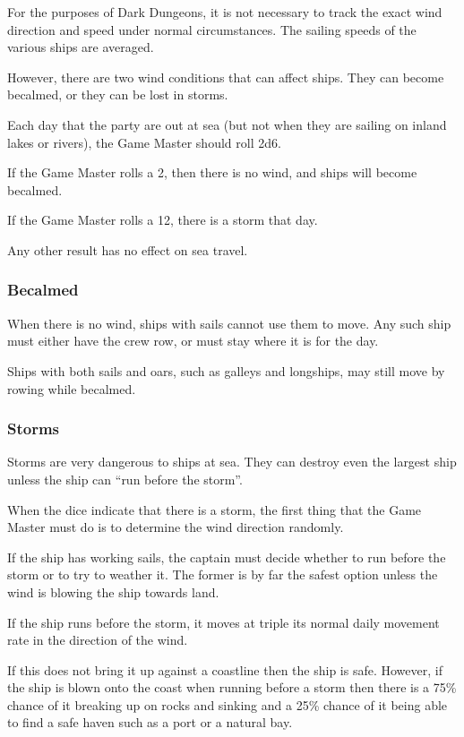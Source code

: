 \begin{multicols*}{2}
For the purposes of Dark Dungeons, it is not necessary to track the exact wind direction and speed under normal circumstances. The sailing speeds of the various ships are averaged.

However, there are two wind conditions that can affect ships. They can become becalmed, or they can be lost in storms.

Each day that the party are out at sea (but not when they are sailing on inland lakes or rivers), the Game Master should roll 2d6.

If the Game Master rolls a 2, then there is no wind, and ships will become becalmed.

If the Game Master rolls a 12, there is a storm that day.

Any other result has no effect on sea travel.

\subsubsection{Becalmed}
When there is no wind, ships with sails cannot use them to move. Any such ship must either have the crew row, or must stay where it is for the day.

Ships with both sails and oars, such as galleys and longships, may still move by rowing while becalmed.

\subsubsection{Storms}
Storms are very dangerous to ships at sea. They can destroy even the largest ship unless the ship can “run before the storm”.

When the dice indicate that there is a storm, the first thing that the Game Master must do is to determine the wind direction randomly.

If the ship has working sails, the captain must decide whether to run before the storm or to try to weather it. The former is by far the safest option unless the wind is blowing the ship towards land.

If the ship runs before the storm, it moves at triple its normal daily movement rate in the direction of the wind.

If this does not bring it up against a coastline then the ship is safe. However, if the ship is blown onto the coast when running before a storm then there is a 75\% chance of it breaking up on rocks and sinking and a 25\% chance of it being able to find a safe haven such as a port or a natural bay.


\end{multicols*}
